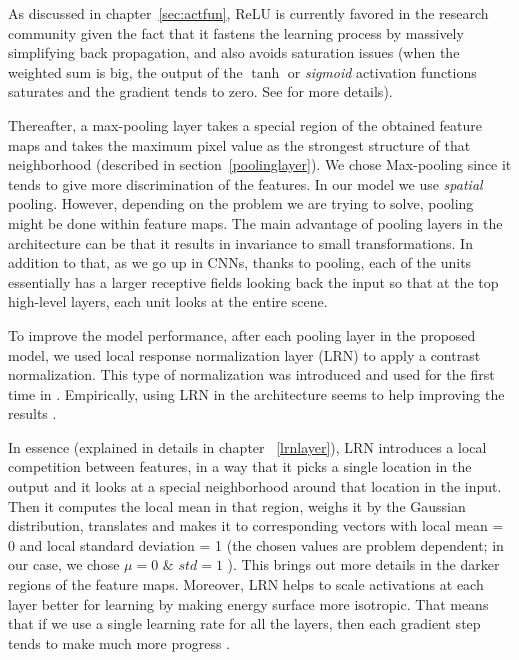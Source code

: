 As discussed in chapter~\ref{sec:actfun}, ReLU is currently favored in the research community given the fact that it fastens the learning process by massively simplifying back propagation, and also avoids saturation issues (when the weighted sum is big, the output of the $\tanh$ or \textit{sigmoid} activation functions saturates and the gradient tends to zero. See \cite{hansen1990neural, amit1987statistical} for more details). 

\indent Thereafter, a max-pooling layer takes a special region of the obtained feature maps and takes the maximum pixel value as the strongest structure of that neighborhood (described in section~\ref{poolinglayer}). We chose Max-pooling since it tends to give more discrimination of the features\cite{boureau2010theoretical}. In our model we use \textit{spatial} pooling. However, depending on the problem we are trying to solve, pooling might be done within feature maps\cite{goodfellow2013maxout}. The main advantage of pooling layers in the architecture can be that it results in invariance to small transformations. In addition to that, as we go up in CNNs, thanks to pooling, each of the units essentially has a larger receptive fields looking back the input so that at the top high-level layers, each unit looks at the entire scene.  

To improve the model performance, after each pooling layer in the proposed model, we used local response normalization layer (LRN) to apply a contrast normalization. This type of normalization was introduced and used for the first time in \cite{krizhevsky2012imagenet}. Empirically, using LRN in the architecture seems to help improving the results \cite{jarrett2009best, krizhevsky2012imagenet}. 

In essence (explained in details in chapter ~\ref{lrnlayer}), LRN introduces a local competition between features, in a way that it picks a single location in the output and it looks at a special neighborhood around that location in the input. Then it computes the local mean in that region, weighs it by the Gaussian distribution, translates and makes it to corresponding vectors with local mean = 0 and local standard deviation = 1 (the chosen values are problem dependent; in our case, we chose $\mu = 0$ \& $std = 1 $ ). This brings out more details in the darker regions of the feature maps. Moreover, LRN helps to scale activations at each layer better for learning by making energy surface more isotropic. That means that if we use a single learning rate for all the layers, then each gradient step tends to make much more progress  \cite{jarrett2009best}. 

